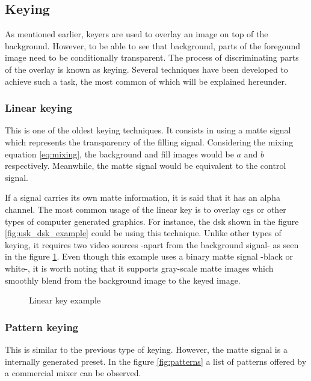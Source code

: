 \documentclass[../main.tex]{subfiles}
\begin{document}
\subsection{Keying}
As mentioned earlier, keyers are used to overlay an image on top of the background. However, to be able to see that background, parts of the foregound image need to be conditionally transparent. The process of discriminating parts of the overlay is known as keying. Several techniques have been developed to achieve such a task, the most common of which will be explained hereunder.\newline

\subsubsection{Linear keying}
This is one of the oldest keying techniques. It consists in using a matte signal which represents the transparency of the filling signal. Considering the mixing equation \eqref{eq:mixing}, the background and fill images would be $a$ and $b$ respectively. Meanwhile, the matte signal would be equivalent to the control signal.\newline

If a signal carries its own matte information, it is said that it has an alpha channel. The most common usage of the linear key is to overlay \glspl{cg} or other types of computer generated graphics. For instance, the \gls{dsk} shown in the figure \ref{fig:usk_dsk_example} could be using this technique. Unlike other types of keying, it requires two video sources -apart from the background signal- as seen in the figure \ref{fig:linear_key_example}. Even though this example uses a binary matte signal -black or white-, it is worth noting that it supports gray-scale matte images which smoothly blend from the background image to the keyed image.\newline

\begin{figure}[htbp]
    \centering

    \caption{Linear key example}
    \label{fig:linear_key_example}
\end{figure}

\subsubsection{Pattern keying}
This is similar to the previous type of keying. However, the matte signal is a internally generated preset. In the figure \ref{fig:patterns} a list of patterns offered by a commercial mixer can be observed.\newline
\end{document}
